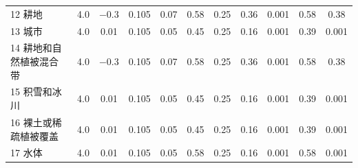 \begin{landscape}
\begin{table}[htbp]
\begin{tabular}{@{}lcccccccccc@{}}
% 
        12 耕地         & 4.0         & \num{-0.3        } & 0.105          & 0.07          & 0.58          & 0.25          & 0.36          & 0.001          & 0.58           & 0.38 \\
        13 城市         & 4.0          & \num { 0.01}          & 0.105          & 0.05          & 0.45          & 0.25          & 0.16          & 0.001          & 0.39          & 0.001         \\
        14 耕地和自然植被混合带 & 4.0          & \num { -0.3}          & 0.105          & 0.07          & 0.58          & 0.25          & 0.36          & 0.001          & 0.58          & 0.38          \\
        15 积雪和冰川      & 4.0          & \num { 0.01}          & 0.105          & 0.05          & 0.45          & 0.25          & 0.16          & 0.001          & 0.39          & 0.001         \\
        16 裸土或稀疏植被覆盖  & 4.0          & \num { 0.01}          & 0.105          & 0.05          & 0.45          & 0.25          & 0.16          & 0.001          & 0.39          & 0.001         \\
        17 水体     & 4.0          & 0.01          & 0.105          & 0.05          & 0.58          & 0.25          & 0.16          & 0.001          & 0.58          & 0.001         \\\bottomrule
        \end{tabular}
\end{table}
\end{landscape}

